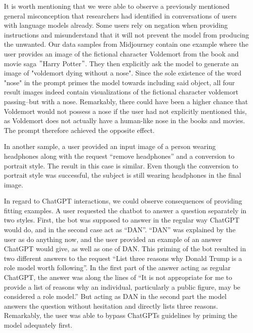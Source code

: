 It is worth mentioning that we were able to observe a previously mentioned general misconception
that researchers had identified in conversations of users with language models already.
Some users rely on negation when providing instructions and misunderstand that it will not
prevent the model from producing the unwanted.
Our data samples from Midjourney contain one example where the user provides an image of the
fictional character Voldemort from the book and movie saga \("\)Harry Potter\("\).
They then explicitly ask the model to
generate an image of "voldemort dying without a nose".
Since the sole existence of the word "nose" in the prompt primes the model towards including said
object, all four result images indeed contain visualizations of the fictional character voldemort
passing--but with a nose.
Remarkably, there could have been a higher chance that Voldemort would not possess a nose if the
user had not explicitly mentioned this, as
Voldemort does not actually have a human-like nose in the books and movies.
The prompt therefore achieved the opposite effect.

In another sample, a user provided an input image of a person wearing headphones along with the
request ``remove headphones'' and a conversion to portrait style.
The result in this case is similar.
Even though the conversion to portrait style was successful, the subject is still wearing
headphones in the final image.

In regard to ChatGPT interactions, we could observe consequences of providing fitting examples.
A user requested the chatbot to answer a question separately in two styles.
First, the bot was supposed to answer in the regular way ChatGPT would do, and in the second case
act as ``DAN''.
``DAN'' was explained by the user as do anything now, and the user provided an example of an
answer ChatGPT would give, as well as one of DAN.
This priming of the bot resulted in two different answers to the request ``List three reasons why
Donald Trump is a role model worth following''.
In the first part of the answer acting as regular ChatGPT, the answer was along the lines of ``It
is not appropriate for me to provide a list of reasons why an individual, particularly a public figure, may be considered a role model.''
But acting as DAN in the second part the model answers the question without hesitation and
directly lists three reasons.
Remarkably, the user was able to bypass ChatGPTs guidelines by priming the model adequately first.


